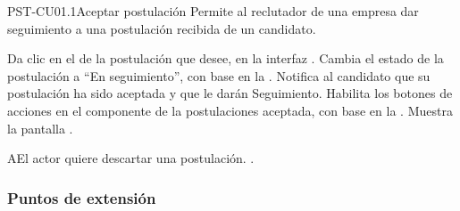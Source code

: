 \clearpage
\begin{UseCase}[]{PST-CU01.1}{Aceptar postulación}{
	Permite al reclutador de una empresa dar seguimiento a una postulación recibida de un candidato.
	}
\end{UseCase}

\begin{UCtrayectoria}
	\UCpaso [\UCactor] Da clic en el  de la postulación que desee, en la interfaz .
	\UCpaso [\UCsist] Cambia el estado de la postulación a ``En seguimiento'', con base en la .
	\UCpaso [\UCsist] Notifica al candidato que su postulación ha sido aceptada y que le darán Seguimiento.
	\UCpaso [\UCsist] Habilita los botones de acciones en el componente  de la postulaciones aceptada, con base en la .
	\UCpaso [\UCsist] Muestra la pantalla . \label{PST-CU01:1}

\end{UCtrayectoria}


\begin{UCtrayectoriaA}{A}{El actor quiere descartar una postulación.}
	.
\end{UCtrayectoriaA} 

\subsubsection{Puntos de extensión}
